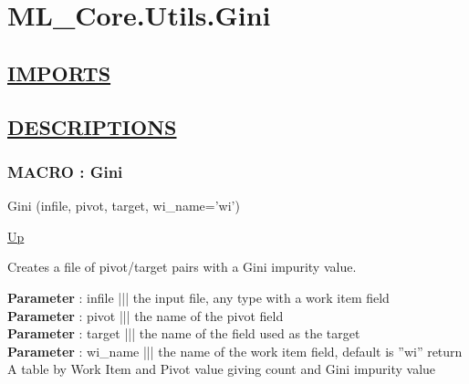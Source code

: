 \chapter*{ML\_Core.Utils.Gini}
\hypertarget{ecldoc:toc:ML_Core.Utils.Gini}{}

\section*{\underline{IMPORTS}}

\section*{\underline{DESCRIPTIONS}}
\subsection*{MACRO : Gini}
\hypertarget{ecldoc:ml_core.utils.gini}{}
\begin{minipage}[t]{\textwidth}
\begin{flushleft}
 Gini (infile, pivot, target, wi\_name='wi')
\end{flushleft}
\end{minipage}
\hyperlink{ecldoc:toc:ML_Core/Utils}{Up}

\par
Creates a file of pivot/target pairs with a Gini impurity value.
\par
\textbf{Parameter} : infile ||| the input file, any type with a work item field \\
\textbf{Parameter} : pivot ||| the name of the pivot field \\
\textbf{Parameter} : target ||| the name of the field used as the target \\
\textbf{Parameter} : wi\_name ||| the name of the work item field, default is ''wi'' return A table by Work Item and Pivot value giving count and Gini impurity value \\

